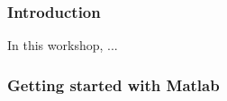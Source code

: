 \documentclass[9pt]{beamer-control}
\begin{document}

\begin{frame}
\frametitle{Introduction}
In this workshop, ...
\end{frame}


\begin{frame}[fragile]
\frametitle{Getting started with Matlab}



\end{frame}
\end{document}
